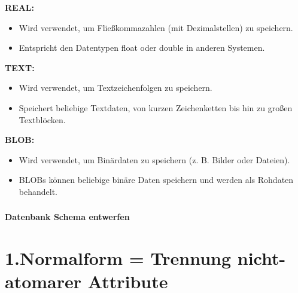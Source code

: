\documentclass{article}
\begin{document}
\textbf{REAL:}

\begin{itemize}

\item \textbf{}Wird verwendet, um Fließkommazahlen (mit Dezimalstellen) zu speichern.

\item \textbf{}Entspricht den Datentypen float oder double in anderen Systemen.

\end{itemize}

\textbf{TEXT:}

\begin{itemize}

\item \textbf{}Wird verwendet, um Textzeichenfolgen zu speichern.

\item \textbf{}Speichert beliebige Textdaten, von kurzen Zeichenketten bis hin zu großen Textblöcken.

\end{itemize}

\textbf{BLOB:}

\begin{itemize}

\item \textbf{}Wird verwendet, um Binärdaten zu speichern (z. B. Bilder oder Dateien).

\item \textbf{}BLOBs können beliebige binäre Daten speichern und werden als Rohdaten behandelt.

\end{itemize}

\subsubsection{}

\textbf{Datenbank Schema entwerfen}

\section*{1.Normalform = Trennung nicht-atomarer Attribute}

\renewcommand{\arraystretch}{1.2} 
\end{document}
